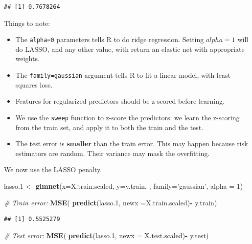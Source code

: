 \documentclass[]{book}
\newenvironment{Shaded}{\begin{snugshade}}{\end{snugshade}}
\newcommand{\CommentTok}[1]{\textcolor[rgb]{0.56,0.35,0.01}{\textit{#1}}}
\newcommand{\DataTypeTok}[1]{\textcolor[rgb]{0.13,0.29,0.53}{#1}}
\newcommand{\DecValTok}[1]{\textcolor[rgb]{0.00,0.00,0.81}{#1}}
\newcommand{\FloatTok}[1]{\textcolor[rgb]{0.00,0.00,0.81}{#1}}
\newcommand{\KeywordTok}[1]{\textcolor[rgb]{0.13,0.29,0.53}{\textbf{#1}}}
\newcommand{\NormalTok}[1]{#1}
\newcommand{\OperatorTok}[1]{\textcolor[rgb]{0.81,0.36,0.00}{\textbf{#1}}}
\newcommand{\StringTok}[1]{\textcolor[rgb]{0.31,0.60,0.02}{#1}}
\providecommand{\tightlist}{%
  \setlength{\itemsep}{0pt}\setlength{\parskip}{0pt}}
\theoremstyle{definition}
\theoremstyle{definition}
\theoremstyle{definition}
\theoremstyle{remark}
\begin{document}
\begin{verbatim}
## [1] 0.7678264
\end{verbatim}

Things to note:

\begin{itemize}
\tightlist
\item
  The \texttt{alpha=0} parameters tells R to do ridge regression. Setting \(alpha=1\) will do LASSO, and any other value, with return an elastic net with appropriate weights.
\item
  The \texttt{family=\textquotesingle{}gaussian\textquotesingle{}} argument tells R to fit a linear model, with least squares loss.
\item
  Features for regularized predictors should be z-scored before learning.
\item
  We use the \texttt{sweep} function to z-score the predictors: we learn the z-scoring from the train set, and apply it to both the train and the test.
\item
  The test error is \textbf{smaller} than the train error. This may happen because risk estimators are random. Their variance may mask the overfitting.
\end{itemize}

We now use the LASSO penalty.

\begin{Shaded}
\begin{Highlighting}[]
\NormalTok{lasso}\FloatTok{.1}\NormalTok{ <-}\StringTok{ }\KeywordTok{glmnet}\NormalTok{(}\DataTypeTok{x=}\NormalTok{X.train.scaled, }\DataTypeTok{y=}\NormalTok{y.train, , }\DataTypeTok{family=}\StringTok{'gaussian'}\NormalTok{, }\DataTypeTok{alpha =} \DecValTok{1}\NormalTok{)}

\CommentTok{# Train error:}
\KeywordTok{MSE}\NormalTok{( }\KeywordTok{predict}\NormalTok{(lasso}\FloatTok{.1}\NormalTok{, }\DataTypeTok{newx =}\NormalTok{X.train.scaled)}\OperatorTok{-}\StringTok{ }\NormalTok{y.train)}
\end{Highlighting}
\end{Shaded}

\begin{verbatim}
## [1] 0.5525279
\end{verbatim}

\begin{Shaded}
\begin{Highlighting}[]
\CommentTok{# Test error:}
\KeywordTok{MSE}\NormalTok{( }\KeywordTok{predict}\NormalTok{(lasso}\FloatTok{.1}\NormalTok{, }\DataTypeTok{newx =}\NormalTok{ X.test.scaled)}\OperatorTok{-}\StringTok{ }\NormalTok{y.test)}
\end{Highlighting}
\end{Shaded}
\end{document}
